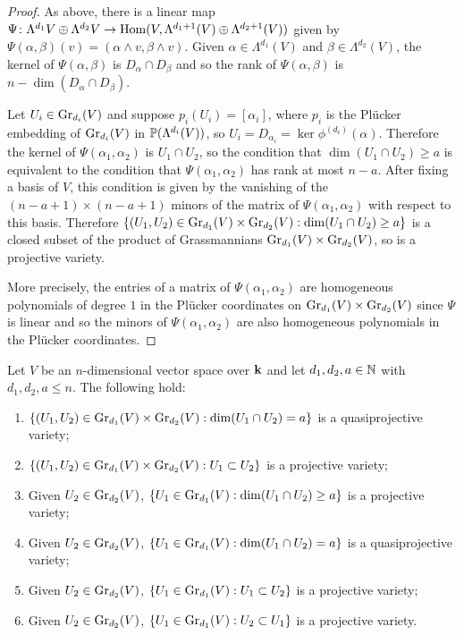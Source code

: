 \documentclass[a4paper, 11pt]{report}
\begin{document}
\begin{proof}
As above, there is a linear map $\Psi\colon\Lambda^{d_1}{V}\oplus\Lambda^{d_2}{V}\to\HOM(V,\Lambda^{d_1+1}(V)\oplus\Lambda^{d_2+1}(V))$ given by $\Psi(\alpha,\beta)(v) = (\alpha\wedge v,\beta\wedge v)$. Given $\alpha\in\Lambda^{d_1}(V)$ and $\beta\in\Lambda^{d_2}(V)$, the kernel of $\Psi(\alpha,\beta)$ is $D_\alpha\cap D_\beta$ and so the rank of $\Psi(\alpha,\beta)$ is $n-\dim(D_\alpha\cap D_\beta)$.

Let $U_i\in\GR[d_i]{V}$ and suppose $p_i(U_i)=[\alpha_i]$, where $p_i$ is the Pl\"ucker embedding of $\GR[d_i]{V}$ in $\Proj{(\Lambda^{d_i}(V))}$, so $U_i = D_{\alpha_i} = \ker{\phi^{(d_i)}(\alpha)}$. Therefore the kernel of $\Psi(\alpha_1,\alpha_2)$ is $U_1\cap U_2$, so the condition that $\dim(U_1\cap U_2)\geq a$ is equivalent to the condition that $\Psi(\alpha_1,\alpha_2)$ has rank at most $n-a$. After fixing a basis of $V$, this condition is given by the vanishing of the $(n-a+1)\times(n-a+1)$ minors of the matrix of $\Psi(\alpha_1,\alpha_2)$ with respect to this basis. Therefore $\{(U_1,U_2)\in\GR[d_1]{V}\times\GR[d_2]{V}:\dim(U_1\cap U_2)\geq a\}$ is a closed subset of the product of Grassmannians $\GR[d_1]{V}\times\GR[d_2]{V}$, so is a projective variety.

More precisely, the entries of a matrix of $\Psi(\alpha_1,\alpha_2)$ are homogeneous polynomials of degree $1$ in the Pl\"ucker coordinates on $\GR[d_1]{V}\times\GR[d_2]{V}$ since $\Psi$ is linear and so the minors of $\Psi(\alpha_1,\alpha_2)$ are also homogeneous polynomials in the Pl\"ucker coordinates.
\end{proof}

\begin{lemma}\label{lemma:grassmannian-incidence-lemmas}
Let $V$ be an $n$-dimensional vector space over $\field$ and let $d_1,d_2,a\in\naturals$ with $d_1,d_2,a\le n$. The following hold:
\begin{enumerate}
\item
$\{(U_1,U_2)\in\GR[d_1]{V}\times\GR[d_2]{V}: \dim(U_1\cap U_2) = a\}$ is a quasiprojective variety;
\item
$\{(U_1,U_2)\in\GR[d_1]{V}\times\GR[d_2]{V}: U_1\subset U_2\}$ is a projective variety;
\item
Given $U_2\in\GR[d_2]{V}$, $\{U_1\in\GR[d_1]{V}: \dim(U_1\cap U_2)\geq a\}$ is a projective variety;
\item
Given $U_2\in\GR[d_2]{V}$, $\{U_1\in\GR[d_1]{V}:\dim(U_1\cap U_2) = a\}$ is a quasiprojective variety;
\item
Given $U_2\in\GR[d_2]{V}$, $\{U_1\in\GR[d_1]{V}: U_1\subset U_2\}$ is a projective variety;
\item
Given $U_2\in\GR[d_2]{V}$, $\{U_1\in\GR[d_1]{V}: U_2\subset U_1\}$ is a projective variety.
\end{enumerate}
\end{lemma}
\end{document}
